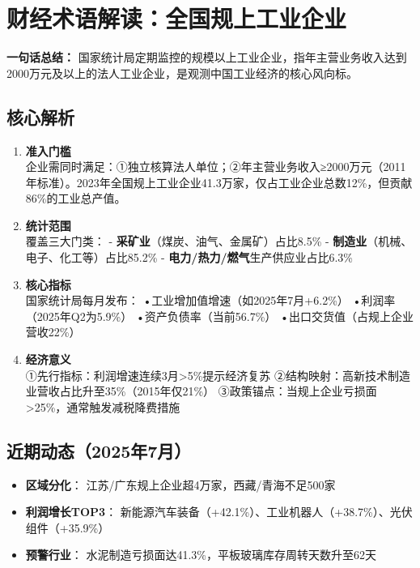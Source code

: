 \section{财经术语解读：全国规上工业企业}
\textbf{一句话总结：}  
国家统计局定期监控的规模以上工业企业，指年主营业务收入达到2000万元及以上的法人工业企业，是观测中国工业经济的核心风向标。

\subsection{核心解析}
\begin{enumerate}[leftmargin=*, nosep]
    \item \textbf{准入门槛}  \\
    企业需同时满足：①独立核算法人单位；②年主营业务收入≥2000万元（2011年标准）。2023年全国规上工业企业41.3万家，仅占工业企业总数12\%，但贡献86\%的工业总产值。
    
    \item \textbf{统计范围}  \\
    覆盖三大门类：  
    - \textbf{采矿业}（煤炭、油气、金属矿）占比8.5\%  
    - \textbf{制造业}（机械、电子、化工等）占比85.2\%  
    - \textbf{电力/热力/燃气}生产供应业占比6.3\%
    
    \item \textbf{核心指标}  \\
    国家统计局每月发布：  
    •工业增加值增速（如2025年7月+6.2\%）  
    •利润率（2025年Q2为5.9\%）  
    •资产负债率（当前56.7\%）  
    •出口交货值（占规上企业营收22\%）
    
    \item \textbf{经济意义}  \\
    ①先行指标：利润增速连续3月>5\%提示经济复苏  
    ②结构映射：高新技术制造业营收占比升至35\%（2015年仅21\%）  
    ③政策锚点：当规上企业亏损面>25\%，通常触发减税降费措施
\end{enumerate}

\subsection{近期动态（2025年7月）}
\begin{itemize}[leftmargin=*, nosep]
    \item \textbf{区域分化}：  
    江苏/广东规上企业超4万家，西藏/青海不足500家
    \item \textbf{利润增长TOP3}：  
    新能源汽车装备（+42.1\%）、工业机器人（+38.7\%）、光伏组件（+35.9\%）
    \item \textbf{预警行业}：  
    水泥制造亏损面达41.3\%，平板玻璃库存周转天数升至62天
\end{itemize}


